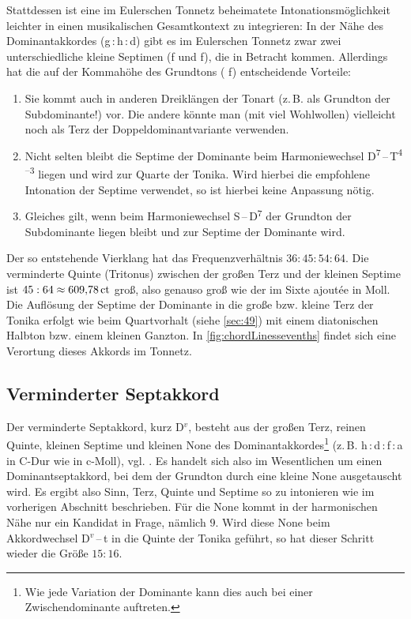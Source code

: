 Stattdessen ist eine im Eulerschen Tonnetz beheimatete Intonationsmöglichkeit
leichter in einen musikalischen Gesamtkontext zu integrieren: In der Nähe des
Dominantakkordes (g\,:\,\naturalm h\,:\,d) gibt es im Eulerschen Tonnetz zwar
zwei unterschiedliche kleine Septimen (\natural f und \naturalp f), die in
Betracht kommen.  Allerdings hat die auf der Kommahöhe des Grundtons (\natural
f) entscheidende Vorteile:
\begin{enumerate}
\item Sie kommt auch in anderen Dreiklängen der Tonart (z.\,B. als Grundton der
  Subdominante!) vor.  Die andere könnte man (mit viel Wohlwollen) vielleicht
  noch als Terz der Doppeldominantvariante verwenden.
\item Nicht selten bleibt die Septime der Dominante beim Harmoniewechsel
  D\textsuperscript{$7$}\,–\,T\textsuperscript{$4$–$3$} liegen und wird zur
  Quarte der Tonika.  Wird hierbei die empfohlene Intonation der Septime
  verwendet, so ist hierbei keine Anpassung nötig.
\item Gleiches gilt, wenn beim Harmoniewechsel S\,–\,D\textsuperscript{$7$} der
  Grundton der Subdominante liegen bleibt und zur Septime der Dominante wird.
\end{enumerate}
Der so entstehende Vierklang hat das Frequenzverhältnis $36:45:54:64$. Die
verminderte Quinte (Tritonus) zwischen der großen Terz und der kleinen Septime
ist $45:64\approx 609{,}78\,\text{ct}$ groß, also genauso groß wie der im Sixte
ajoutée in Moll. Die Auflösung der Septime der Dominante in die große bzw.
kleine Terz der Tonika erfolgt wie beim Quartvorhalt (siehe \cref{sec:49}) mit
einem diatonischen Halbton bzw. einem kleinen Ganzton. In
\cref{fig:chordLinessevenths} findet sich eine Verortung dieses Akkords im
Tonnetz.

\subsection{Verminderter Septakkord}
\label{sec:dim7syn}


Der verminderte Septakkord, kurz D$^v$, besteht aus der großen Terz, reinen
Quinte, kleinen Septime und kleinen None des Dominantakkordes\footnote{Wie jede
  Variation der Dominante kann dies auch bei einer Zwischendominante auftreten.}
(z.\,B. h\,:\,d\,:\,f\,:\,\flat a in C-Dur wie in c-Moll),
vgl. \cite[{}11.1]{Skript}. Es handelt sich also im Wesentlichen um einen
Dominantseptakkord, bei dem der Grundton durch eine kleine None ausgetauscht
wird. Es ergibt also Sinn, Terz, Quinte und Septime so zu intonieren wie im
vorherigen Abschnitt beschrieben. Für die None kommt in der harmonischen Nähe
nur ein Kandidat in Frage, nämlich \flatp $9$.  Wird diese None beim
Akkordwechsel D$^v$\,–\,t in die Quinte der Tonika geführt, so hat dieser
Schritt wieder die Größe $15:16$.

